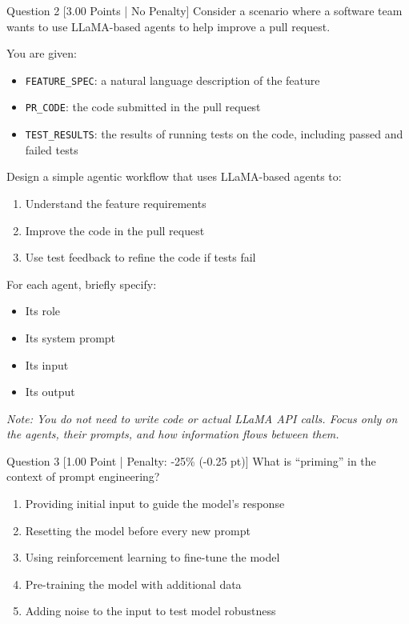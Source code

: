 \documentclass[11pt,a4paper]{article}
\begin{document}
\begin{questionbox}{Question 2 \hfill [3.00 Points | No Penalty]}
Consider a scenario where a software team wants to use LLaMA-based agents to help improve a pull request.

\noindent You are given:
\begin{itemize}[noitemsep]
    \item \texttt{FEATURE\_SPEC}: a natural language description of the feature
    \item \texttt{PR\_CODE}: the code submitted in the pull request
    \item \texttt{TEST\_RESULTS}: the results of running tests on the code, including passed and failed tests
\end{itemize}

\noindent Design a simple agentic workflow that uses LLaMA-based agents to:
\begin{enumerate}[noitemsep]
    \item Understand the feature requirements
    \item Improve the code in the pull request
    \item Use test feedback to refine the code if tests fail
\end{enumerate}

\noindent For each agent, briefly specify:
\begin{itemize}[noitemsep]
    \item Its role
    \item Its system prompt
    \item Its input
    \item Its output
\end{itemize}

\noindent\textit{Note: You do not need to write code or actual LLaMA API calls. Focus only on the agents, their prompts, and how information flows between them.}
\end{questionbox}

\vspace{0.3cm}

\begin{questionbox}{Question 3 \hfill [1.00 Point | Penalty: -25\% (-0.25 pt)]}
What is ``priming'' in the context of prompt engineering?

\begin{enumerate}[label=\alph*.,itemsep=2pt]
    \item Providing initial input to guide the model's response
    \item Resetting the model before every new prompt
    \item Using reinforcement learning to fine-tune the model
    \item Pre-training the model with additional data
    \item Adding noise to the input to test model robustness
\end{enumerate}
\end{questionbox}
\end{document}
